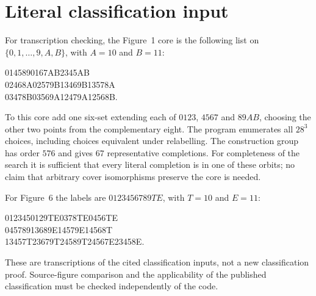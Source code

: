 \documentclass[11pt]{article}
\theoremstyle{definition}
\theoremstyle{remark}
\begin{document}
\section{Literal classification input}\label{app:literal}
For transcription checking, the Figure~1 core is the following list on
$\{0,1,\ldots,9,A,B\}$, with $A=10$ and $B=11$:
\begin{center}\ttfamily\small
014589\quad 0167AB\quad 2345AB\\
02468A\quad 02579B\quad 13469B\quad 13578A\\
03478B\quad 03569A\quad 12479A\quad 12568B.
\end{center}
To this core add one six-set extending each of $0123$, $4567$ and
$89AB$, choosing the other two points from the complementary eight.
The program enumerates all $28^3$ choices, including choices equivalent
under relabelling. The construction group has order $576$ and gives
$67$ representative completions. For completeness of the search it is
sufficient that every literal completion is in one of these orbits;
no claim that arbitrary cover isomorphisms preserve the core is needed.

For Figure~6 the labels are $0123456789TE$, with $T=10$ and $E=11$:
\begin{center}\ttfamily\small
012345\quad 0129TE\quad 0378TE\quad 0456TE\\
045789\quad 13689E\quad 14579E\quad 14568T\\
13457T\quad 23679T\quad 24589T\quad 24567E\quad 23458E.
\end{center}
These are transcriptions of the cited classification inputs, not a new
classification proof. Source-figure comparison and the applicability of
the published classification must be checked independently of the code.
\end{document}
